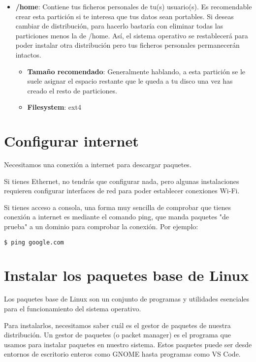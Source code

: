 \begin{itemize}
    \item \textbf{/home}: Contiene tus ficheros personales de tu(s) usuario(s). Es recomendable crear esta partición si te interesa que tus datos sean portables. Si deseas cambiar de distribución, para hacerlo bastaría con eliminar todas las particiones menos la de /home. Así, el sistema operativo se restablecerá para poder instalar otra distribución pero tus ficheros personales permanecerán intactos.

    \begin{itemize}
        \item \textbf{Tamaño recomendado}: Generalmente hablando, a esta partición se le suele asignar el espacio restante que le queda a tu disco una vez has creado el resto de particiones.
        \item \textbf{Filesystem}: ext4
    \end{itemize}
\end{itemize}

\section{Configurar internet}
Necesitamos una conexión a internet para descargar paquetes.

Si tienes Ethernet, no tendrás que configurar nada, pero algunas instalaciones requieren configurar interfaces de red para poder establecer conexiones Wi-Fi.

Si tienes acceso a consola, una forma muy sencilla de comprobar que tienes conexión a internet es mediante el comando ping, que manda paquetes "de prueba" a un dominio para comprobar la conexión. Por ejemplo:

\begin{tcolorbox-code}
\begin{lstlisting}
$ ping google.com
\end{lstlisting}
\end{tcolorbox-code}

\section{Instalar los paquetes base de Linux}
Los paquetes base de Linux son un conjunto de programas y utilidades esenciales para el funcionamiento del sistema operativo.

Para instalarlos, necesitamos saber cuál es el gestor de paquetes de nuestra distribución. Un gestor de paquetes (o packet manager) es el programa que usamos para instalar paquetes en nuestro sistema. Estos paquetes puede ser desde entornos de escritorio enteros como GNOME hasta programas como VS Code.

